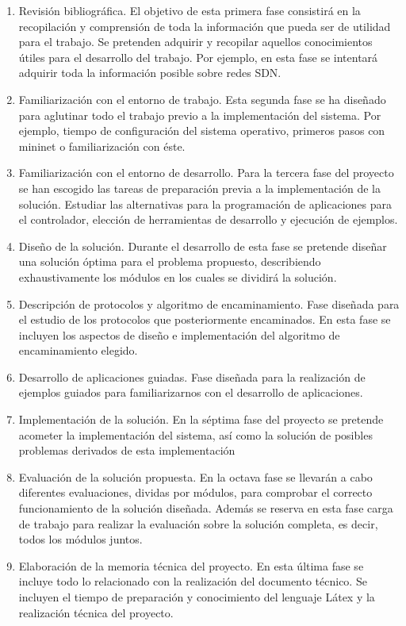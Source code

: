 \documentclass[a4paper,11pt]{book}
\begin{document}
\begin{enumerate}
\item Revisión bibliográfica. El objetivo de esta primera fase consistirá en la recopilación y comprensión de toda la información que pueda ser de utilidad para el trabajo. Se pretenden adquirir y recopilar aquellos conocimientos útiles para el desarrollo del trabajo. Por ejemplo, en esta fase se intentará adquirir toda la información posible sobre redes \ac{SDN}.
\item Familiarización con el entorno de trabajo. Esta segunda fase se ha diseñado para aglutinar todo el trabajo previo a la implementación del sistema. Por ejemplo, tiempo de configuración del sistema operativo, primeros pasos con mininet o familiarización con éste.
\item Familiarización con el entorno de desarrollo. Para la tercera fase del proyecto se han escogido las tareas de preparación previa a la implementación de la solución. Estudiar las alternativas para la programación de aplicaciones para el controlador, elección de herramientas de desarrollo y ejecución de ejemplos.
\item Diseño de la solución. Durante el desarrollo de esta fase se pretende diseñar una solución óptima para el problema propuesto, describiendo exhaustivamente los módulos en los cuales se dividirá la solución.
\item Descripción de protocolos y algoritmo de encaminamiento. Fase diseñada para el estudio de los protocolos que posteriormente encaminados. En esta fase se incluyen los aspectos de diseño e implementación del algoritmo de encaminamiento elegido.
\item Desarrollo de aplicaciones guiadas. Fase diseñada para la realización de ejemplos guiados para familiarizarnos con el desarrollo de aplicaciones.
\item Implementación de la solución. En la séptima fase del proyecto se pretende acometer la implementación del sistema, así como la solución de posibles problemas derivados de esta implementación
\item Evaluación de la solución propuesta. En la octava fase se llevarán a cabo diferentes evaluaciones, dividas por módulos, para comprobar el correcto funcionamiento de la solución diseñada. Además se reserva en esta fase carga de trabajo para realizar la evaluación sobre la solución completa, es decir, todos los módulos juntos.
\item Elaboración de la memoria técnica del proyecto. En esta última fase se incluye todo lo relacionado con la realización del documento técnico. Se incluyen el tiempo de preparación y conocimiento del lenguaje Látex y la realización técnica del proyecto.
\end{enumerate}
\end{document}
